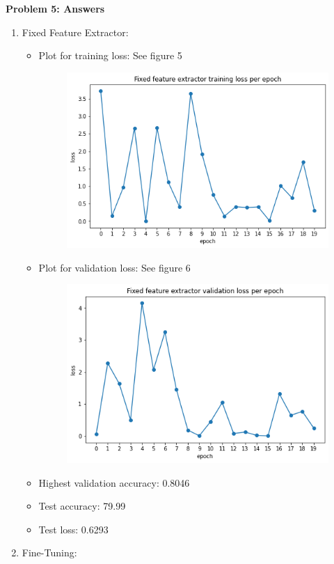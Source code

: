 {\bf Problem 5: Answers}

\begin{enumerate}
    \item Fixed Feature Extractor:
	\begin{itemize}
	    \item Plot for training loss: See figure 5
		\begin{figure}[h!]
		    \centering
		    \includegraphics[width=0.8\linewidth]{../plots/ffe_t.png}
		    \caption{}
		\end{figure}
	    \item Plot for validation loss: See figure 6
		\begin{figure}[h!]
		    \centering
		    \includegraphics[width=0.8\linewidth]{../plots/ffe_v.png}
		    \caption{}
		\end{figure}
	    \item Highest validation accuracy: 0.8046
	    \item Test accuracy: 79.99
	    \item Test loss: 0.6293 
	\end{itemize}
    \item Fine-Tuning:
	\begin{itemize}

\end{itemize}
\end{enumerate}
